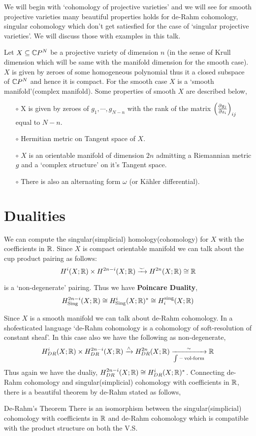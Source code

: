 \documentclass[11pt]{article}
\author{\textbf{Notes By:} \textsc{Trishan Mondal} \\[0.15cm]
   \textbf{Speaker:} \textsc{Suresh Nayak} \\[0.15cm]
  \href{https://www.isibang.ac.in}{Indian Statistical Institute, Bangalore}}
\date{}
\begin{document}
\maketitle

\noindent We will begin with `cohomology of projective varieties' and we will see for smooth projective varieties many beautiful properties holds for de-Rahm cohomology, singular cohomology which don't get satiesfied for the case of `singular projective varieties'. We will discuss those with examples in this talk. 

\vspace*{0.2cm}

\noindent Let $X\subseteq \mathbb{C} P^N$ be a projective variety of dimension $n$ (in the sense of Krull dimension which will be same with the manifold dimension for the smooth case). $X$ is given by zeroes of some homogeneous polynomial thus it a closed subspace of $\mathbb{C} P^N$ and hence it is compact. For the smooth case $X$ is a `smooth manifold'(complex manifold). Some properties of smooth $X$ are described below, 

\begin{itemize}
    \item[$\circ$] X is given by zeroes of $g_1,\cdots,g_{N-n}$ with the rank of the matrix $\qty(\pdv{g_j}{z_i})_{ij}$ equal to $N-n$.
    \item[$\circ$] Hermitian metric on Tangent space of $X$.   
    \item[$\circ$] $X$ is an orientable manifold of dimension $2n$ admitting a Riemannian metric $g$ and a `complex structure' on it's Tangent space. 
    \item[$\circ$] There is also an alternating form $\omega$ (or K\"{a}hler differential). 
\end{itemize}

\section{Dualities}
We can compute the singular(simplicial) homology(cohomology) for $X$ with the coefficients in $\mathbb{R}$. Since $X$ is compact orientable manifold we can talk about the cup product pairing as follows: 
\[H^{i}(X;\mathbb{R}) \times H^{2n-i}(X;\mathbb{R}) \xrightarrow{\smile} H^{2n}(X;\mathbb{R}) \cong \mathbb{R}\]

\noindent is a `non-degenerate' pairing. Thus we have \textbf{Poincare Duality}, $$H^{2n-i}_{\text{Sing}}(X;\mathbb{R}) \cong H^{i}_{\text{Sing}}(X;\mathbb{R})^* \cong H_i^{\text{sing}}(X;\mathbb{R})$$

\noindent Since $X$ is a smooth manifold we can talk about de-Rahm cohomology. In a shofesticated language `de-Rahm cohomology is a cohomology of soft-resolution of constant sheaf'. In this case also we have the following as non-degenerate, 
\[H^{i}_{DR}(X;\mathbb{R}) \times H^{2n-i}_{DR}(X;\mathbb{R}) \xrightarrow{\wedge} H^{2n}_{DR}(X;\mathbb{R}) \xrightarrow[\int - \operatorname{vol-form}]{\sim} \mathbb{R}\]
Thus again we have the dualiy, $H^{2n-i}_{DR}(X;\mathbb{R}) \cong H^{i}_{DR}(X;\mathbb{R})^*$. Connecting de-Rahm cohomology and singular(simplicial) cohomology with coefficients in $\mathbb{R}$, there is a beautiful theorem by de-Rahm stated as follows, 

\begin{Thm}{De-Rahm's Theorem}{}
     There is an isomorphism between the singular(simplicial) cohomology with coefficients in $\mathbb{R}$ and de-Rahm cohomology which is compatible with the product structure on both the V.S. 
\end{Thm}
\end{document}
